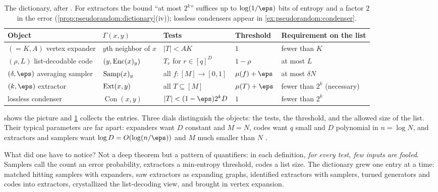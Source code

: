 \begin{refsection}
\begin{table}[t]
\begin{fullwidth}
\centering\small
\renewcommand{\arraystretch}{1.2}
\begin{tabular}{@{}lllll@{}}
\toprule
Object & $\Gamma(x,y)$ & Tests & Threshold & Requirement on the list\\
\midrule
$({=}K,A)$ vertex expander & $y$th neighbor of $x$ & $|T|<AK$ & $1$ & fewer than $K$\\
$(\rho,L)$ list-decodable code & $(y,\operatorname{Enc}(x)_y)$ & $T_r$ for $r\in[q]^D$ & $1-\rho$ & at most $L$\\
$(\delta,\eps)$ averaging sampler & $\operatorname{Samp}(x)_y$ & all $f\colon[M]\to[0,1]$ & $\mu(f)+\eps$ & at most $\delta N$\\
$(k,\eps)$ extractor & $\operatorname{Ext}(x,y)$ & all $T\subseteq[M]$ & $\mu(T)+\eps$ & fewer than $2^k$ (necessary)\\
lossless condenser & $\operatorname{Con}(x,y)$ & $|T|<(1-\eps)2^kD$ & $1$ & fewer than $2^k$\\
\bottomrule
\end{tabular}
\caption{The dictionary, after \textcite[Table~8.1]{Vadhan2012}. For extractors the bound ``at most $2^k$'' suffices up to $\log(1/\eps)$ bits of entropy and a factor $2$ in the error (\cref{prop:pseudorandom:dictionary}(iv)); lossless condensers appear in \cref{ex:pseudorandom:condenser}.}
\label{tab:pseudorandom:dictionary}
\end{fullwidth}
\end{table}

 shows the picture and \cref{tab:pseudorandom:dictionary} collects the entries. Three dials distinguish the objects: the tests, the threshold, and the allowed size of the list. Their typical parameters are far apart: expanders want $D$ constant and $M=N$, codes want $q$ small and $D$ polynomial in $n=\log N$, and extractors and samplers want $\log D=O(\log(n/\eps))$ and $M$ much smaller than $N$ \parencite[\S8.1]{Vadhan2012}.

What did one have to notice? Not a deep theorem but a pattern of quantifiers: in each definition, \emph{for every test, few inputs are fooled}. Samplers call the count an error probability, extractors a min-entropy threshold, codes a list size. The dictionary grew one entry at a time: \textcite{Sipser1988} matched hitting samplers with expanders, \textcite{NisanZuckerman1996} saw extractors as expanding graphs, \textcite{Zuckerman1997} identified extractors with samplers, \textcite{Trevisan2001} turned generators and codes into extractors, \textcite{TaShmaZuckerman2004} crystallized the list-decoding view, and \textcite{GuruswamiUmansVadhan2009} brought in vertex expansion.


\end{refsection}
